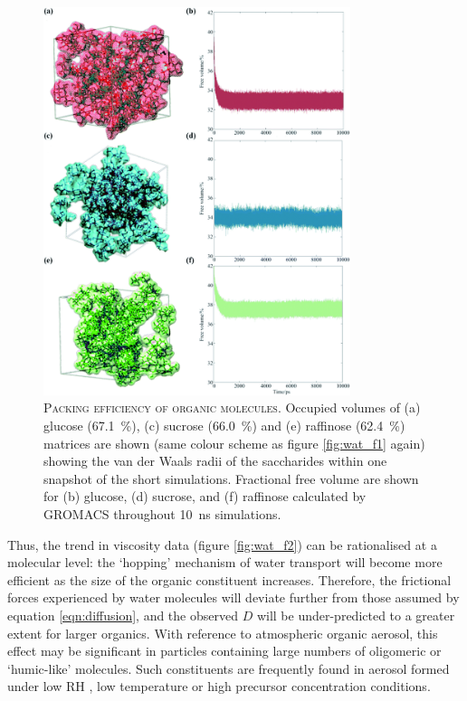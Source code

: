 \begin{figure}
    \centering
    \includegraphics[width=0.8\textwidth]{chapters/water_hopping/figures/f5.png}
    \caption[Packing efficiency of organic molecules]{\textsc{Packing efficiency of organic molecules}. Occupied volumes of (a) glucose (\SI{67.1}{\percent}), (c) sucrose (\SI{66.0}{\percent}) and (e) raffinose (\SI{62.4}{\percent}) matrices are shown (same colour scheme as figure \ref{fig:wat_f1} again) showing the van der Waals radii of the saccharides within one snapshot of the short simulations. Fractional free volume are shown for (b) glucose, (d) sucrose, and (f) raffinose calculated by GROMACS throughout \SI{10}{\nano\second} simulations.}
    \label{fig:wat_packing_eff}
\end{figure}

Thus, the trend in viscosity data (figure \ref{fig:wat_f2}) can be rationalised at a molecular level: the `hopping’ mechanism of water transport will become more efficient as the size of the organic constituent increases. Therefore, the frictional forces experienced by water molecules will deviate further from those assumed by equation \ref{eqn:diffusion}, and the observed $D$ will be under-predicted to a greater extent for larger organics. With reference to atmospheric organic aerosol, this effect may be significant in particles containing large numbers of oligomeric or `humic-like’ molecules. Such constituents are frequently found in aerosol formed under low RH \cite{Jia2018}, low temperature \cite{huang2018alpha} or high precursor concentration \cite{Kourtchev2016} conditions.

